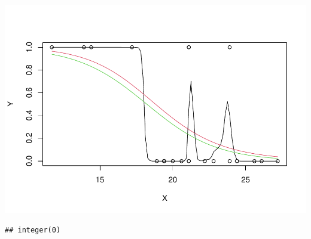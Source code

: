 \documentclass[
]{article}
\begin{document}
\includegraphics{Problemsetrmd_files/figure-latex/unnamed-chunk-3-1.pdf}

\begin{verbatim}
## integer(0)
\end{verbatim}
\end{document}
